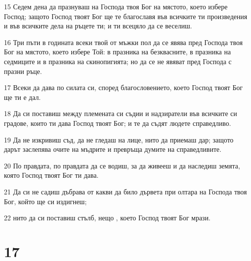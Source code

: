 \par 15 Седем дена да празнуваш на Господа твоя Бог на мястото, което избере Господ; защото Господ твоят Бог ще те благославя във всичките ти произведения и във всичките дела на ръцете ти; и ти всецяло да се веселиш.
\par 16 Три пъти в годината всеки твой от мъжки пол да се явява пред Господа твоя Бог на мястото, което избере Той: в празника на безквасните, в празника на седмиците и в празника на скинопигията; но да се не явяват пред Господа с празни ръце.
\par 17 Всеки да дава по силата си, според благословението, което Господ твоят Бог ще ти е дал.
\par 18 Да си поставиш между племената си съдии и надзиратели във всичките си градове, които ти дава Господ твоят Бог; и те да съдят людете справедливо.
\par 19 Да не изкривиш съд, да не гледаш на лице, нито да приемаш дар; защото дарът заслепява очите на мъдрите и превръща думите на справедливите.
\par 20 По правдата, по правдата да се водиш, за да живееш и да наследиш земята, която Господ твоят Бог ти дава.
\par 21 Да си не садиш дъбрава от какви да било дървета при олтара на Господа твоя Бог, който ще си издигнеш;
\par 22 нито да си поставиш стълб, нещо , което Господ твоят Бог мрази.

\chapter{17}

